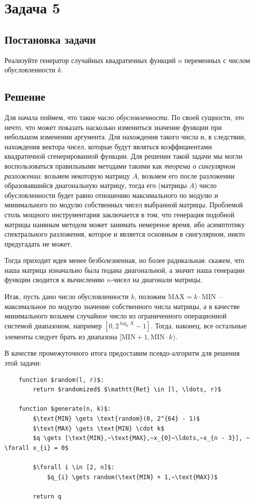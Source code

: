 \documentclass[12pt, a4paper, oneside, final]{article}
\begin{document}
	\section*{Задача 5}
	\subsection*{Постановка задачи}
	Реализуйте генератор случайных квадратичных функций $n$ переменных с числом обусловленности $k$.
	\subsection*{Решение}
	Для начала поймем, что такое \textit{число обусловленности}. По своей сущности, это нечто, что может показать насколько измениться значение функции при небольшом изменении аргумента. Для нахождения такого числа и, в следствии, нахождения вектора чисел, которые будут являться коэффициентами квадратичной сгенерированной функции. Для решении такой задачи мы могли воспользоваться правильными методами такими как \textit{теорема о сингулярном разложении}: возьмем некоторую матрицу $A$, возьмем его после разложении образовавшийся диагональную матрицу, тогда его (матрицы $A$) число обусловленности будет равно отношению максимального по модулю и минимального по модулю собственных чисел выбранной матрицы. Проблемой столь мощного инструментария заключается в том, что генерация подобной матрицы наивным методом может занимать немереное время, ибо асимптотику спектрального разложения, которое и является основным в сингулярном, никто предугадать не может.

	Тогда приходит идея менее безболезненная, но более радикальная: скажем, что наша матрица изначально была подана диагональной, а значит наша генерации функции сводится к вычислению $n$-чисел на диагонали матрицы.

	Итак, пусть дано число обусловленности $k$, положим $\text{MAX} = k \cdot \text{MIN}$~-- максимальное по модулю значение собственного числа матрицы, а в качестве минимального возьмем случайное число из ограниченного операционной системой диапазоном, например $[0, 2^{\log_{2}{X}} - 1]$. Тогда, наконец, все остальные элементы следует брать из диапазона $[\text{MIN} + 1, \text{MIN} \cdot k)$.

	В качестве промежуточного итога предоставим псевдо-алгоритм для решения этой задачи:
	\begin{lstlisting}
	function $random(l, r)$:
		return $randomized$ $\mathtt{Ret} \in [l, \ldots, r)$
	
	function $generate(n, k)$:
		$\text{MIN} \gets \text{random}(0, 2^{64} - 1)$
		$\text{MAX} \gets \text{MIN} \cdot k$
		$q \gets [\text{MIN},~\text{MAX},~x_{0}~\ldots,~x_{n - 3}], ~ \forall x_{i} = 0$

		$\forall i \in [2, n]$:
			$q_{i} \gets random(\text{MIN} + 1,~\text{MAX})$

		return q
	\end{lstlisting}
	\newpage
\end{document}
